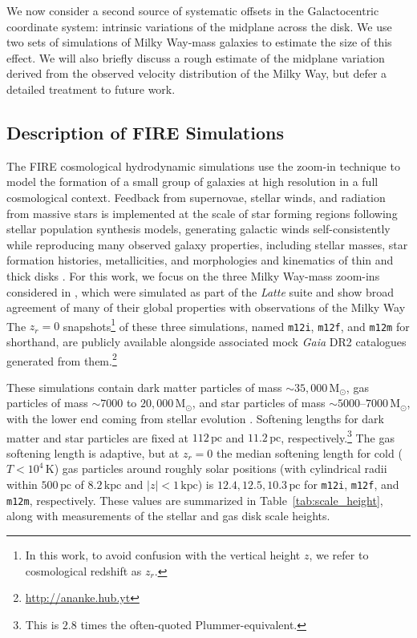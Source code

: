 \documentclass[twocolumn]{aastex62}
\newcommand{\Msun}{\ensuremath{\text{M}_\odot}}
\newcommand{\pc}{\text{pc}}
\newcommand{\kpc}{\text{kpc}}
\newcommand{\mi}{\texttt{m12i}}
\newcommand{\mf}{\texttt{m12f}}
\newcommand{\mm}{\texttt{m12m}}
\newcommand{\abs}[1]{\left| #1 \right|}
\newcommand{\z}{z_r}
\begin{document}
We now consider a second source of systematic offsets in the Galactocentric
coordinate system: intrinsic variations of the midplane across the disk. We
use two sets of simulations of Milky Way-mass galaxies to estimate the size of
this effect. We will also briefly discuss a rough estimate of the midplane
variation derived from the observed velocity distribution of the Milky Way,
but defer a detailed treatment to future work.

\subsection{Description of FIRE Simulations} \label{ssec:cosmozoom}
The FIRE cosmological hydrodynamic simulations
\citep{2014MNRAS.445..581H,2018MNRAS.480..800H} use the zoom-in technique
\citep[e.g.][]{1993ApJ...412..455K,2014MNRAS.437.1894O} to model the formation
of a small group of galaxies at high resolution in a full cosmological
context.  Feedback from supernovae, stellar winds, and radiation from massive
stars is implemented at the scale of star forming regions following stellar
population synthesis models, generating galactic winds self-consistently
\citep{2015MNRAS.454.2691M, 2017MNRAS.470.4698A} while reproducing many
observed galaxy properties, including stellar masses, star formation
histories, metallicities, and morphologies and kinematics of thin and thick
disks \citep{2014MNRAS.445..581H, 2016MNRAS.456.2140M, 2017MNRAS.467.2430M,
2016ApJ...827L..23W, 2018MNRAS.481.4133G, 2018MNRAS.480..800H}. For this work,
we focus on the three Milky Way-mass zoom-ins considered in
\citet{2018arXiv180610564S}, which were simulated as part of the
\textit{Latte} suite and show broad agreement of many of their global
properties with observations of the Milky Way \citep{2016ApJ...827L..23W,
2018MNRAS.481.4133G} The $\z = 0$ snapshots\footnote{In this work, to avoid
confusion with the vertical height $z$, we refer to cosmological redshift as
$\z$.} of these three simulations, named \mi{}, \mf{}, and \mm{} for
shorthand, are publicly available alongside associated mock \textit{Gaia} DR2
catalogues generated from them.\footnote{\url{http://ananke.hub.yt}}

These simulations contain dark matter particles of mass $\sim35,000\,\Msun$,
gas particles of mass $\sim 7000$ to $20,000\,\Msun$, and star particles
of mass $\sim 5000 \text{--} 7000\,
\Msun$, with the lower end
coming from stellar evolution \citep{2018arXiv180610564S}. Softening lengths
for dark matter and star particles are fixed at $112\,\pc$ and $11.2\,\pc$,
respectively.\footnote{This is $2.8$ times the often-quoted
Plummer-equivalent.} The gas softening length is adaptive, but at $\z=0$ the
median softening length for cold ($T < 10^4\,\text{K}$) gas particles around
roughly solar positions (with cylindrical radii within $500\,\pc$ of
$8.2\,\kpc$ and $\abs{z}<1\,\kpc$) is $12.4, 12.5, 10.3\,\pc$ for \mi{},
\mf{}, and \mm{}, respectively. These values are summarized in
Table~\ref{tab:scale_height}, along with measurements of the stellar and gas
disk scale heights.
\end{document}
